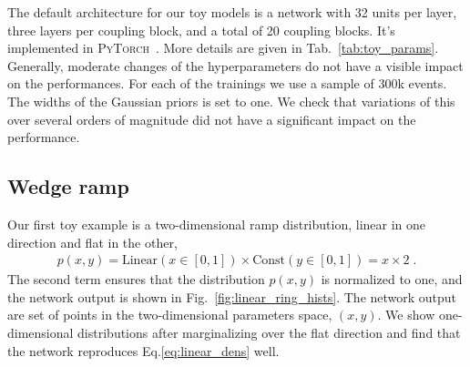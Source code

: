 The default architecture for our toy models is a
network with 32 units per layer, three layers per
coupling block, and a total of 20 coupling blocks. 
It's implemented in \textsc{PyTorch}~\cite{pytorch}. More details are
given in Tab.~\ref{tab:toy_params}.  Generally, moderate changes 
of the hyperparameters do not have a visible impact on the
performances. For each of the trainings we use a sample of 300k
events. The widths of the Gaussian priors is set to one. We check that
variations of this over several orders of magnitude did not have a
significant impact on the performance.

\subsection{Wedge ramp}
\label{sec:toy_wedge}

Our first toy example is a two-dimensional ramp distribution, linear
in one direction and flat in the other,
%
\begin{align}
p(x, y) = \text{Linear}(x \in [0, 1]) \times \text{Const}(y \in [0, 1]) = x \times 2 \; .
\label{eq:linear_dens}
\end{align}
%
The second term ensures that the distribution $p(x,y)$ is normalized
to one, and the network output is shown in
Fig.~\ref{fig:linear_ring_hists}. The network output are set of points in the 
two-dimensional parameters space, $(x,y)$. We show
one-dimensional distributions after marginalizing over the flat
direction and find that the network reproduces
Eq.\eqref{eq:linear_dens} well.

